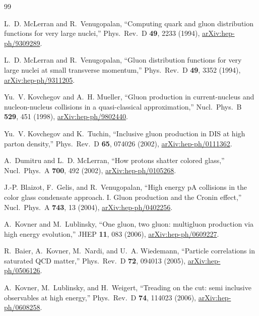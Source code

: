 \begin{thebibliography}{99}

L.~D. McLerran and R.~Venugopalan, ``Computing quark and gluon distribution functions for very large nuclei,'' Phys.\ Rev.\ D \textbf{49}, 2233 (1994), \href{https://arxiv.org/abs/hep-ph/9309289}{arXiv:hep-ph/9309289}.

L.~D. McLerran and R.~Venugopalan, ``Gluon distribution functions for very large nuclei at small transverse momentum,'' Phys.\ Rev.\ D \textbf{49}, 3352 (1994), \href{https://arxiv.org/abs/hep-ph/9311205}{arXiv:hep-ph/9311205}.

Yu.~V. Kovchegov and A.~H. Mueller, ``Gluon production in current-nucleus and nucleon-nucleus collisions in a quasi-classical approximation,'' Nucl.\ Phys.\ B \textbf{529}, 451 (1998), \href{https://arxiv.org/abs/hep-ph/9802440}{arXiv:hep-ph/9802440}.

Yu.~V. Kovchegov and K.~Tuchin, ``Inclusive gluon production in DIS at high parton density,'' Phys.\ Rev.\ D \textbf{65}, 074026 (2002), \href{https://arxiv.org/abs/hep-ph/0111362}{arXiv:hep-ph/0111362}.

A.~Dumitru and L.~D. McLerran, ``How protons shatter colored glass,'' Nucl.\ Phys.\ A \textbf{700}, 492 (2002), \href{https://arxiv.org/abs/hep-ph/0105268}{arXiv:hep-ph/0105268}.

J.-P. Blaizot, F.~Gelis, and R.~Venugopalan, ``High energy pA collisions in the color glass condensate approach. I. Gluon production and the Cronin effect,'' Nucl.\ Phys.\ A \textbf{743}, 13 (2004), \href{https://arxiv.org/abs/hep-ph/0402256}{arXiv:hep-ph/0402256}.

A.~Kovner and M.~Lublinsky, ``One gluon, two gluon: multigluon production via high energy evolution,'' JHEP \textbf{11}, 083 (2006), \href{https://arxiv.org/abs/hep-ph/0609227}{arXiv:hep-ph/0609227}.

R.~Baier, A.~Kovner, M.~Nardi, and U.~A. Wiedemann, ``Particle correlations in saturated QCD matter,'' Phys.\ Rev.\ D \textbf{72}, 094013 (2005), \href{https://arxiv.org/abs/hep-ph/0506126}{arXiv:hep-ph/0506126}.

A.~Kovner, M.~Lublinsky, and H.~Weigert, ``Treading on the cut: semi inclusive observables at high energy,'' Phys.\ Rev.\ D \textbf{74}, 114023 (2006), \href{https://arxiv.org/abs/hep-ph/0608258}{arXiv:hep-ph/0608258}.


\end{thebibliography}
